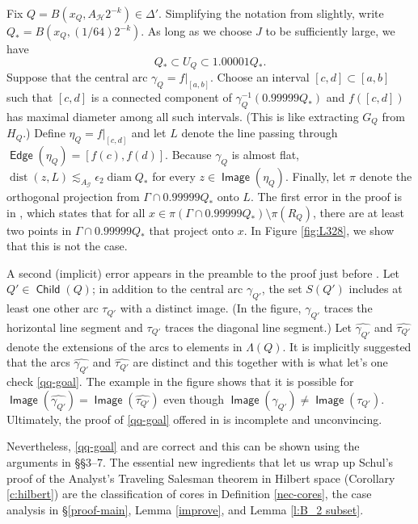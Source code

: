 \documentclass[12pt]{amsart}
\numberwithin{equation}{section}
\theoremstyle{plain}
\theoremstyle{definition}
\newcommand{\diam}{\mathop\mathrm{diam}\nolimits}
\newcommand{\dist}{\mathop\mathrm{dist}\nolimits}
\newcommand{\Image}{\mathop\mathsf{Image}\nolimits}
\newcommand{\Edge}{\mathop\mathsf{Edge}\nolimits}
\newcommand{\Child}{\mathop\mathsf{Child}\nolimits}
\numberwithin{figure}{section}
\begin{document}
Fix $Q=B(x_Q,A_\mathscr{H}2^{-k})\in\Delta'$. Simplifying the notation from \cite{Schul-Hilbert} slightly, write $Q_*=B(x_Q,(1/64)2^{-k})$. As long as we choose $J$ to be sufficiently large, we have $$Q_*\subset U_Q\subset 1.00001Q_*.$$ Suppose that the central arc $\gamma_Q=f|_{[a,b]}$. Choose an interval $[c,d]\subset[a,b]$ such that $[c,d]$ is a connected component of $\gamma_{Q}^{-1}(0.99999Q_*)$ and $f([c,d])$ has maximal diameter among all such intervals. (This is like extracting $G_Q$ from $H_Q$.) Define $\eta_Q=f|_{[c,d]}$ and let $L$ denote the line passing through $\Edge(\eta_Q)=[f(c),f(d)]$. Because $\gamma_Q$ is almost flat, $\dist(z,L)\lesssim_{A_\mathscr{G}} \epsilon_2 \diam Q_*$ for every $z\in\Image(\eta_Q)$. Finally, let $\pi$ denote the orthogonal projection from $\Gamma\cap 0.99999Q_*$ onto $L$. The first error in the proof is in \cite[(3.24)]{Schul-Hilbert}, which states that for all $x\in\pi(\Gamma\cap 0.99999Q_*)\setminus \pi(R_Q)$, there are at least two points in $\Gamma\cap 0.99999Q_*$ that project onto $x$. In Figure \ref{fig:L328}, we show that this is not the case.

A second (implicit) error appears in the preamble to the proof just before \cite[Remark 3.27]{Schul-Hilbert}. Let $Q'\in\Child(Q)$; in addition to the central arc $\gamma_{Q'}$, the set $S(Q')$ includes at least one other arc $\tau_{Q'}$ with a distinct image. (In the figure, $\gamma_{Q'}$ traces the horizontal line segment and $\tau_{Q'}$ traces the diagonal line segment.) Let $\widehat{\gamma_{Q'}}$ and $\widehat{\tau_{Q'}}$ denote the extensions of the arcs to elements in $\Lambda(Q)$. It is implicitly suggested that the arcs $\widehat{\gamma_{Q'}}$ and $\widehat{\tau_{Q'}}$ are distinct and this together with \cite[(3.24)]{Schul-Hilbert} is what let's one check \eqref{qq-goal}. The example in the figure shows that it is possible for $\Image(\widehat{\gamma_{Q'}})=\Image(\widehat{\tau_{Q'}})$ even though $\Image(\gamma_{Q'})\neq \Image(\tau_{Q'})$. Ultimately, the proof of \eqref{qq-goal} offered in \cite{Schul-Hilbert} is incomplete and unconvincing.

Nevertheless, \eqref{qq-goal} and \cite[Lemma 3.28]{Schul-Hilbert} are correct and this can be shown using the arguments in \S\S3--7. The essential new ingredients that let us wrap up Schul's proof of the Analyst's Traveling Salesman theorem in Hilbert space (Corollary \ref{c:hilbert}) are the classification of cores in Definition \ref{nec-cores}, the case analysis in \S\ref{proof-main}, Lemma \ref{improve}, and Lemma \ref{l:B_2 subset}.



\end{document}
